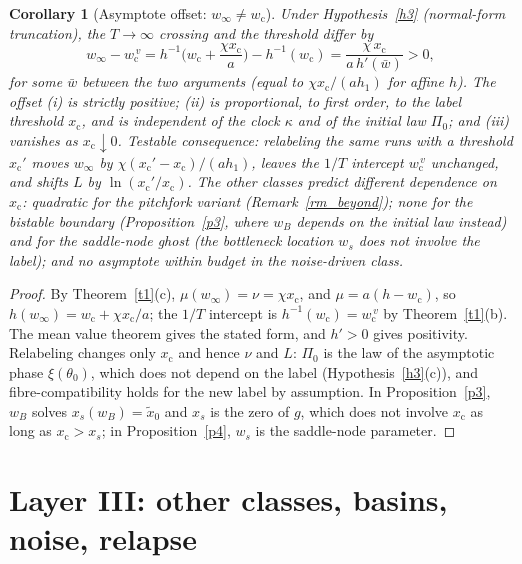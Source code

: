 \documentclass[11pt]{article}
\newtheorem{corollary}{Corollary}
\theoremstyle{definition}
\theoremstyle{remark}
\newcommand{\wcrit}{w_{\mathrm c}}
\newcommand{\xc}{x_{\mathrm c}}
\newcommand{\xmed}{\tilde x_0}
\begin{document}
\begin{corollary}[Asymptote offset: $w_\infty\neq\wcrit$]\label{c4}
Under Hypothesis~\ref{h3} (normal-form truncation), the $T\to\infty$ crossing and the threshold differ by
\[
w_\infty-\wcrit^{\,v}=h^{-1}\!\Big(\wcrit+\frac{\chi\xc}{a}\Big)-h^{-1}(\wcrit)=\frac{\chi\,\xc}{a\,h'(\bar w)}>0,
\]
for some $\bar w$ between the two arguments (equal to $\chi\xc/(ah_1)$ for affine $h$). The offset (i) is strictly positive; (ii) is proportional, to first order, to the label threshold $\xc$, and is independent of the clock $\kappa$ and of the initial law $\Pi_0$; and (iii) vanishes as $\xc\downarrow0$. \emph{Testable consequence:} relabeling the same runs with a threshold $\xc'$ moves $w_\infty$ by $\chi(\xc'-\xc)/(ah_1)$, leaves the $1/T$ intercept $\wcrit^{\,v}$ unchanged, and shifts $L$ by $\ln(\xc'/\xc)$. The other classes predict different dependence on $\xc$: quadratic for the pitchfork variant (Remark~\ref{rm_beyond}); none for the bistable boundary (Proposition~\ref{p3}, where $w_B$ depends on the initial law instead) and for the saddle-node ghost (the bottleneck location $w_s$ does not involve the label); and no asymptote within budget in the noise-driven class.
\end{corollary}
\begin{proof}
By Theorem~\ref{t1}(c), $\mu(w_\infty)=\nu=\chi\xc$, and $\mu=a(h-\wcrit)$, so $h(w_\infty)=\wcrit+\chi\xc/a$; the $1/T$ intercept is $h^{-1}(\wcrit)=\wcrit^{\,v}$ by Theorem~\ref{t1}(b). The mean value theorem gives the stated form, and $h'>0$ gives positivity. Relabeling changes only $\xc$ and hence $\nu$ and $L$: $\Pi_0$ is the law of the asymptotic phase $\xi(\theta_0)$, which does not depend on the label (Hypothesis~\ref{h3}(c)), and fibre-compatibility holds for the new label by assumption. In Proposition~\ref{p3}, $w_B$ solves $x_s(w_B)=\xmed$ and $x_s$ is the zero of $g$, which does not involve $\xc$ as long as $\xc>x_s$; in Proposition~\ref{p4}, $w_s$ is the saddle-node parameter.
\end{proof}

\section{Layer III: other classes, basins, noise, relapse}
\end{document}

